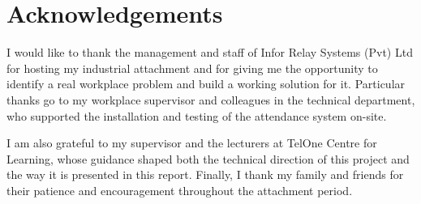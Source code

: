 \chapter*{Acknowledgements}

I would like to thank the management and staff of Infor Relay Systems (Pvt) Ltd for hosting my industrial attachment and for giving me the opportunity to identify a real workplace problem and build a working solution for it. Particular thanks go to my workplace supervisor and colleagues in the technical department, who supported the installation and testing of the attendance system on-site.

I am also grateful to my supervisor and the lecturers at TelOne Centre for Learning, whose guidance shaped both the technical direction of this project and the way it is presented in this report. Finally, I thank my family and friends for their patience and encouragement throughout the attachment period.

\clearpage
